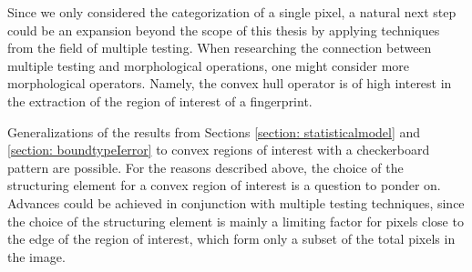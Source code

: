 \documentclass[a4paper,12pt]{article}
\theoremstyle{plain}
\theoremstyle{definition}
\begin{document}
Since we only considered the categorization of a single pixel, a natural next step could be an expansion beyond the scope of this thesis by applying techniques from the field of multiple testing. When researching the connection between multiple testing and morphological operations, one might consider more morphological operators. Namely, the convex hull operator is of high interest in the extraction of the region of interest of a fingerprint.

Generalizations of the results from Sections \ref{section: statisticalmodel} and \ref{section: boundtypeIerror} to convex regions of interest with a checkerboard pattern are possible. For the reasons described above, the choice of the structuring element for a convex region of interest is a question to ponder on. Advances could be achieved in conjunction with multiple testing techniques, since the choice of the structuring element is mainly a limiting factor for pixels close to the edge of the region of interest, which form only a subset of the total pixels in the image.

\newpage



\printbibliography[heading=bibintoc]

\newpage
\end{document}
